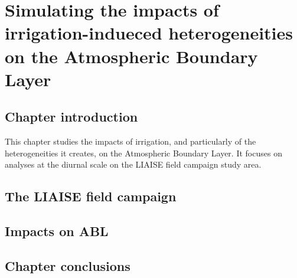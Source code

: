 \chapter{Simulating the impacts of irrigation-indueced heterogeneities on the Atmospheric Boundary Layer}
\label{chap:liaise}
\minitoc
\pagebreak

\section{Chapter introduction}
This chapter studies the impacts of irrigation, and particularly of the heterogeneities it creates, on the Atmospheric Boundary Layer. It focuses on analyses at the diurnal scale on the LIAISE field campaign study area.

\section{The LIAISE field campaign}

\section{Impacts on ABL}

\section{Chapter conclusions}